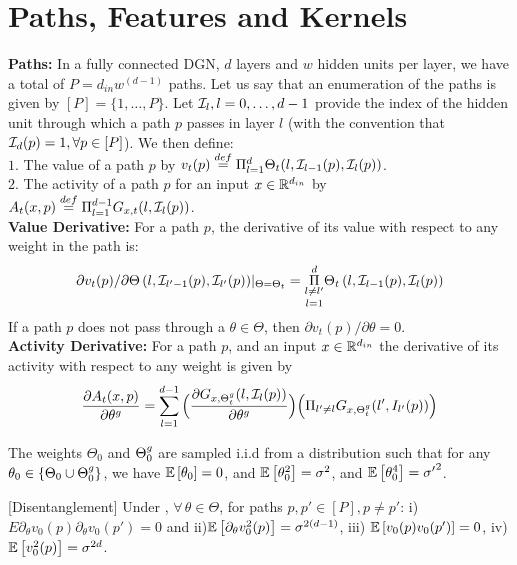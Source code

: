 \section{Paths, Features and Kernels}\label{sec:expressivity}
\textbf{Paths:} In a fully connected DGN, $d$ layers and $w$ hidden units per layer, we have a total of $P=d_{in}w^{(d-1)}$ paths. Let us say that an enumeration of the paths is given by $[P]=\{1,\ldots,P\}$. Let $\mathcal{I}_{l},l=0,\ldots,d-1$ provide the index of the hidden unit through which a path $p$ passes in layer $l$ (with the convention that $\mathcal{I}_d(p)=1,\forall p\in [P]$). We then define:\\
$1.$ The value of a path $p$ by $v_t(p)\stackrel{def}=\Pi_{l=1}^d \Theta_t(l,\mathcal{I}_{l-1}(p),\mathcal{I}_l(p))$.\\
$2.$ The activity of a path $p$ for an input $x\in \mathbb{R}^{d_{in}}$ by $A_{t}(x,p)\stackrel{def}{=}\Pi_{l=1}^{d-1} G_{x,t}(l,\mathcal{I}_l(p))$.\\
\textbf{Value Derivative:} For a path $p$, the derivative of its value with respect to any weight in the path is: 
\begin{align}\label{eq:vft}{\partial v_t(p)}/{\partial \Theta\left(l,\mathcal{I}_{l'-1}(p),\mathcal{I}_{l'}(p)\right)}|_{\Theta=\Theta_t}= \underset{l=1}{\underset{l\neq l'}{\overset{d}{\Pi}}} \Theta_t\left(l,\mathcal{I}_{l-1}(p),\mathcal{I}_{l}(p)\right)
\end{align}
If a path $p$ does not pass through a $\theta\in\Theta$, then ${\partial v_t(p)}/{\partial \theta}=0$.\\
\textbf{Activity Derivative:} For a path $p$, and an input $x\in\mathbb{R}^{d_{in}}$ the derivative of its activity with respect to any weight is given by 
\begin{align}
\frac{\partial A_{t}(x,p)}{\partial \theta^g}= \sum_{l=1}^{d-1} \Big(\frac{\partial G_{x,{\Theta}^g_t}(l,\mathcal{I}_l(p))}{\partial \theta^g} \Big)\Big(\Pi_{l'\neq l} G_{x,{\Theta}^g_t}(l',I_{l'}(p))\Big)
\end{align}
\begin{assumption}\label{assmp:init}
The weights $\Theta_0$ and ${\Theta}^g_0$ are sampled i.i.d from a distribution such that for any $\theta_0\in\{\Theta_0\cup {\Theta}^g_0\}$,  we have $\mathbb{E}\left[\theta_0\right]=0$, and  $\mathbb{E}\left[\theta^2_0\right]=\sigma^2$, and $\mathbb{E}\left[\theta^4_0\right]={\sigma'}^2$.
\end{assumption}
\begin{lemma}\label{lm:disentangle}[Disentanglement]
Under , $\forall\,\theta\in\Theta$, for paths $p,p'\in [P], p\neq p'$:  i) $E{\partial_{\theta}v_0(p)\partial_{\theta}v_0(p')}= 0$ and ii)$\mathbb{E}\left[\partial_{\theta}v^2_0(p)\right]= \sigma^{2(d-1)}$, iii) $\mathbb{E}\left[v_0(p)v_0(p')\right]=0$, iv) $\mathbb{E}\left[v^2_0(p)\right]=\sigma^{2d}$.
\end{lemma}

